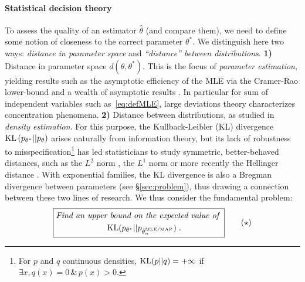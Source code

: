 \documentclass[twoside]{article}
\newcommand{\nat}{\theta}
\begin{document}
\paragraph{Statistical decision theory}
To assess the quality of an estimator $\hat \nat$ (and compare them), we need to define some notion of closeness to the correct parameter $\nat^*$.
We distinguish here two ways: \textit{distance in parameter space} and \textit{``distance'' between distributions}.
{\bf 1)} Distance in parameter space $d(\nat,\nat^*)$. This is the focus of \emph{parameter estimation}, yielding results such as the asymptotic efficiency of the MLE via the Cramer-Rao lower-bound \citep{aitken1942estimation} and a wealth of asymptotic results \citep{vdv1998asymptotic}.
In particular for sum of independent variables such as~\eqref{eq:defMLE}, large deviations theory \citep{varadhan1984large} characterizes concentration phenomena.
{\bf 2)} Distance between distributions, as studied in \emph{density estimation}.
For this purpose, the Kullback-Leibler (KL) divergence $\KL\paren{p_{\nat^*} || p_{\nat} }$  arises naturally from information theory,
but its lack of robustness to misspecification\footnote{
For $p$ and $q$ continuous densities,
$\mathrm{KL}(p||q) = +\infty$ if $\exists x, q(x)=0 \, \& \, p(x)>0$.
}
has led statisticians to study symmetric, better-behaved distances, such as the $L^2$ norm \citep[\S1.2]{tsybakov2009introduction}, the $L^1$ norm \citep{devroye2001combinatorial} or more recently the Hellinger distance \citep{baraud2017new}.
With exponential families, the KL divergence is also a Bregman divergence between parameters (see \S\ref{sec:problem}), thus drawing a connection between these two lines of research.
We thus consider the fundamental problem: %
\begin{equation}
\boxed{
\begin{aligned}
	\textit{Find an upper}&\textit{ bound on the expected value of } \\
	&\KL(p_{\nat^*} || p_{\hat \nat_n^\text{MLE/MAP} }) \; .
\end{aligned}
}
\tag{$\star$}
\label{problem}
\end{equation}
\end{document}
